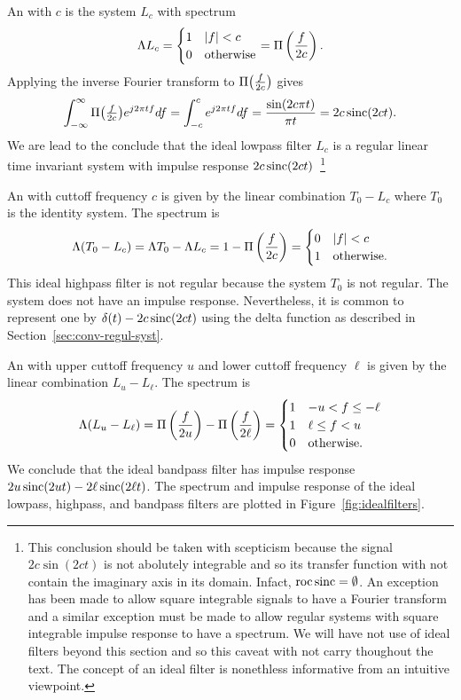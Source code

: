 An  with  $c$ is the system $L_c$ with spectrum
\[
\Lambda L_c = \begin{cases}
1 & \left\vert f \right\vert < c \\
0 & \text{otherwise}
\end{cases}
= \Pi\left(\frac{f}{2c}\right).
\]
Applying the inverse Fourier transform to $\Pi\big(\tfrac{f}{2c}\big)$ gives
\[
\int_{-\infty}^\infty \Pi\big(\tfrac{f}{2c}\big) e^{j2\pi t f} df = \int_{-c}^c e^{j2\pi t f} df = \frac{\sin(2 c\pi t)}{\pi t} = 2c\operatorname{sinc}(2ct).
\]
We are lead to the conclude that the ideal lowpass filter $L_c$ is a regular linear time invariant system with impulse response $2c\operatorname{sinc}(2ct)$~\footnote{This conclusion should be taken with scepticism because the signal $2c\sin(2ct)$ is not abolutely integrable and so its transfer function with not contain the imaginary axis in its domain.  Infact, $\operatorname{roc} \operatorname{sinc} = \emptyset$.  An exception has been made to allow square integrable signals to have a Fourier transform and a similar exception must be made to allow regular systems with square integrable impulse response to have a spectrum. We will have not use of ideal filters beyond this section and so this caveat with not carry thoughout the text.  The concept of an ideal filter is nonethless informative from an intuitive viewpoint.}

An  with cuttoff frequency $c$ is given by the linear combination $T_0 - L_c$ where $T_0$ is the identity system.  The spectrum is
\[
\Lambda(T_0 - L_c) = \Lambda T_0 - \Lambda L_c  = 1 - \Pi\left(\frac{f}{2c}\right) = \begin{cases}
0 &  \left\vert f \right\vert < c \\
1 & \text{otherwise}.
\end{cases}
\]
This ideal highpass filter is not regular because the system $T_0$ is not regular.  The system does not have an impulse response.  Nevertheless, it is common to represent one by $\delta(t) - 2c\operatorname{sinc}(2ct)$ using the delta function as described in Section~\ref{sec:conv-regul-syst}.

An  with upper cuttoff frequency $u$ and lower cuttoff frequency $\ell$ is given by the linear combination $L_u - L_\ell$.  The spectrum is
\[
\Lambda(L_u - L_\ell) = \Pi\left(\frac{f}{2u}\right) - \Pi\left(\frac{f}{2\ell}\right) = \begin{cases}
1 &  -u < f \leq -\ell \\
1 &  \ell \leq f < u \\
0 & \text{otherwise}.
\end{cases}
\]
We conclude that the ideal bandpass filter has impulse response $2u\operatorname{sinc}(2ut) - 2\ell\operatorname{sinc}(2\ell t)$.  The spectrum and impulse response of the ideal lowpass, highpass, and bandpass filters are plotted in Figure~\ref{fig:idealfilters}.


